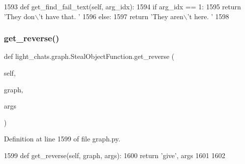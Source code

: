 \begin{DoxyCode}
1593     \textcolor{keyword}{def }get\_find\_fail\_text(self, arg\_idx):
1594         \textcolor{keywordflow}{if} arg\_idx == 1:
1595             \textcolor{keywordflow}{return} \textcolor{stringliteral}{'They don\(\backslash\)'t have that. '}
1596         \textcolor{keywordflow}{else}:
1597             \textcolor{keywordflow}{return} \textcolor{stringliteral}{'They aren\(\backslash\)'t here. '}
1598 
\end{DoxyCode}
\mbox{\label{classlight__chats_1_1graph_1_1StealObjectFunction_a2e77998e7383d823d66f0adc22226ba0}} 
\subsubsection{\texorpdfstring{get\+\_\+reverse()}{get\_reverse()}}
{\footnotesize\ttfamily def light\+\_\+chats.\+graph.\+Steal\+Object\+Function.\+get\+\_\+reverse (\begin{DoxyParamCaption}\item[{}]{self,  }\item[{}]{graph,  }\item[{}]{args }\end{DoxyParamCaption})}



Definition at line 1599 of file graph.\+py.


\begin{DoxyCode}
1599     \textcolor{keyword}{def }get\_reverse(self, graph, args):
1600         \textcolor{keywordflow}{return} \textcolor{stringliteral}{'give'}, args
1601 
1602 
\end{DoxyCode}
\mbox{\label{classlight__chats_1_1graph_1_1StealObjectFunction_a96475b7b415e03eb52d9efee518e755f}} 
